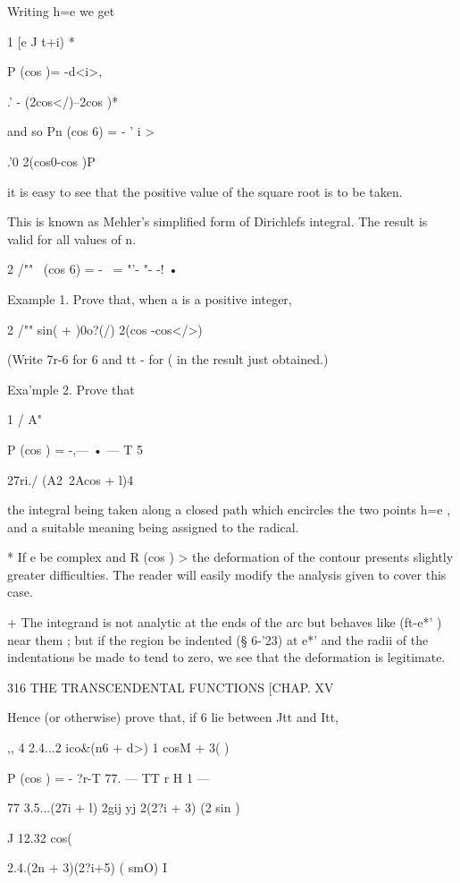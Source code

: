 {{Writing h=e  we get 

1 [e J t+i) * 

P (cos )= -d<i>, 

  .' - (2cos</)--2cos )* 

and so Pn (cos 6) = -   ' i   > 

 .'0  2(cos0-cos )P 

it is easy to see that the positive value of the square root is to be taken. 

This is known as Mehler's simplified form of Dirichlefs integral. The result is valid for 
all values of n. 



2 /"" 
\ (cos 6) = - \ = "'- "- -! • 



Example 1. Prove that, when a is a positive integer, 

2 /"" sin(  +  )0o?(/) 
 2(cos -cos</>)   

(Write 7r-6 for 6 and tt -  for (  in the result just obtained.) 

Exa'mple 2. Prove that 

1 /  A" 

P  (cos  ) = -,— • — T  5 

27ri./ (A2\ 2Acos  + l)4 

the integral being taken along a closed path which encircles the two points h=e  , and 
a suitable meaning being assigned to the radical. 

* If e be complex and R (cos  ) > the deformation of the contour presents slightly greater 
difficulties. The reader will easily modify the analysis given to cover this case. 

+ The integrand is not analytic at the ends of the arc but behaves like (ft-e*' )~  near 
them ; but if the region be indented (§ 6-'23) at e*'  and the radii of the indentations be made to 
tend to zero, we see that the deformation is legitimate. 



316 THE TRANSCENDENTAL FUNCTIONS [CHAP. XV 

Hence (or otherwise) prove that, if 6 lie between Jtt and Itt, 

,, 4 2.4...2  ico\&(n6 + d>) 1  cosM + 3( )\ 

P  (cos  ) = - ?r-T 77. — TT   r  H 1 — 

77 3.5...(27i + l)  2gij yj 2(2?i + 3) (2 sin  )  

J 12.32 cos(%

2.4.(2n + 3)(2?i+5) ( smO)  I 

}}
